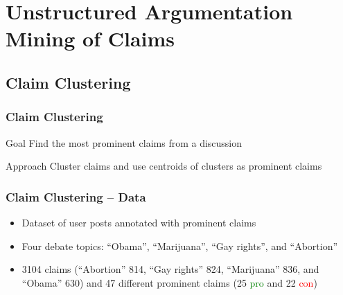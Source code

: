 \documentclass{beamer}
\begin{document}

\section{Unstructured Argumentation Mining of Claims}

\subsection{Claim Clustering}

\begin{frame}
	\frametitle{Claim Clustering}
	\begin{block}{Goal}
		Find the most prominent claims from a discussion
	\end{block}

	\begin{block}{Approach}
		Cluster claims and use centroids of clusters as prominent claims
	\end{block}
\end{frame}


\begin{frame}
	\frametitle{Claim Clustering -- Data}
	\begin{itemize}
		\item Dataset of user posts annotated with prominent claims \cite{hasan2014you}
		\item Four debate topics: 
		``Obama'', ``Marijuana'', ``Gay rights'', and ``Abortion'' 
	\item 3104 claims (``Abortion'' 814, ``Gay rights'' 824, ``Marijuana'' 836, and ``Obama'' 630) and 
		47 different prominent claims (25 \textcolor{green}{pro} and 22 \textcolor{red}{con})
	\end{itemize}
\end{frame}

\end{document}
